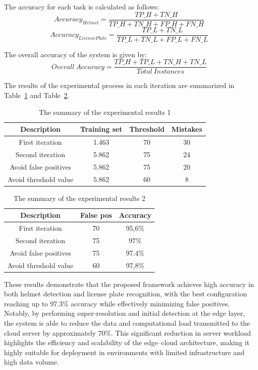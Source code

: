 \documentclass[conference]{IEEEtran}
\begin{document}
The accuracy for each task is calculated as follows:
\begin{equation}
Accuracy_{Helmet} = \frac{TP\_H + TN\_H}{TP\_H + TN\_H + FP\_H + FN\_H}
\end{equation}
\begin{equation}
Accuracy_{LicensePlate} = \frac{TP\_L + TN\_L}{TP\_L + TN\_L + FP\_L + FN\_L}
\end{equation}

The overall accuracy of the system is given by:
\begin{equation}
Overall\ Accuracy = \frac{TP\_H + TP\_L + TN\_H + TN\_L}{Total\ Instances}
\end{equation}

The results of the experimental process in each iteration are summarized in Table~\ref{tab:detect_results1} and Table~\ref{tab:detect_results2}.

\begin{table}[H]
\centering
\caption{The summary of the experimental results 1}
\label{tab:detect_results1}
\begin{tabular}{|c|c|c|c|}
\hline
\textbf{Description} & \textbf{Training set} & \textbf{Threshold} & \textbf{Mistakes} \\
\hline
First iteration & 1.463 & 70 & 30 \\
Second iteration & 5.862 & 75 & 24 \\
Avoid false positives & 5.862 & 75 & 20 \\
Avoid threshold value & 5.862 & 60 & 8 \\
\hline
\end{tabular}
\end{table}

\begin{table}[H]
\centering
\caption{The summary of the experimental results 2}
\label{tab:detect_results2}
\begin{tabular}{|c|c|c|}
\hline
\textbf{Description} & \textbf{False pos} & \textbf{Accuracy} \\
\hline
First iteration & 70 & 95,6\% \\
Second iteration & 75 & 97\% \\
Avoid false positives & 75 & 97.4\% \\
Avoid threshold value & 60 & 97,8\% \\
\hline
\end{tabular}
\end{table}

These results demonstrate that the proposed framework achieves high accuracy in both helmet detection and license plate recognition, with the best configuration reaching up to 97.3\% accuracy while effectively minimizing false positives. Notably, by performing super-resolution and initial detection at the edge layer, the system is able to reduce the data and computational load transmitted to the cloud server by approximately 70\%. This significant reduction in server workload highlights the efficiency and scalability of the edge–cloud architecture, making it highly suitable for deployment in environments with limited infrastructure and high data volume.
\end{document}

